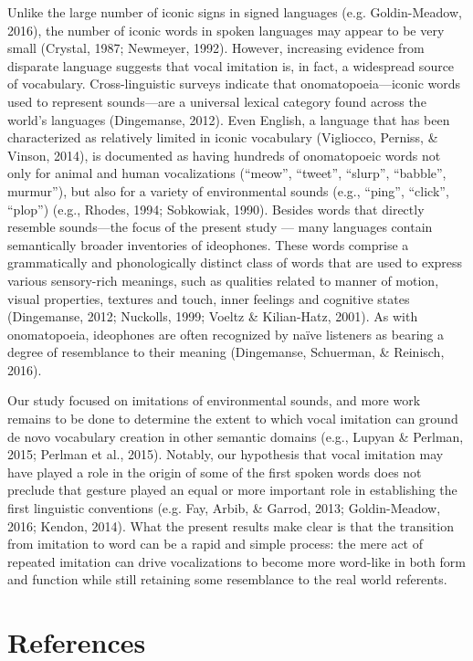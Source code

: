 \documentclass[english,floatsintext,man]{apa6}
\theoremstyle{definition}
\theoremstyle{definition}
\theoremstyle{definition}
\theoremstyle{remark}
\begin{document}
Unlike the large number of iconic signs in signed languages (e.g.
Goldin-Meadow, 2016), the number of iconic words in spoken languages may
appear to be very small (Crystal, 1987; Newmeyer, 1992). However,
increasing evidence from disparate language suggests that vocal
imitation is, in fact, a widespread source of vocabulary.
Cross-linguistic surveys indicate that onomatopoeia---iconic words used
to represent sounds---are a universal lexical category found across the
world's languages (Dingemanse, 2012). Even English, a language that has
been characterized as relatively limited in iconic vocabulary
(Vigliocco, Perniss, \& Vinson, 2014), is documented as having hundreds
of onomatopoeic words not only for animal and human vocalizations
(\enquote{meow}, \enquote{tweet}, \enquote{slurp}, \enquote{babble},
murmur''), but also for a variety of environmental sounds (e.g.,
\enquote{ping}, \enquote{click}, \enquote{plop}) (e.g., Rhodes, 1994;
Sobkowiak, 1990). Besides words that directly resemble sounds---the
focus of the present study --- many languages contain semantically
broader inventories of ideophones. These words comprise a grammatically
and phonologically distinct class of words that are used to express
various sensory-rich meanings, such as qualities related to manner of
motion, visual properties, textures and touch, inner feelings and
cognitive states (Dingemanse, 2012; Nuckolls, 1999; Voeltz \&
Kilian-Hatz, 2001). As with onomatopoeia, ideophones are often
recognized by naïve listeners as bearing a degree of resemblance to
their meaning (Dingemanse, Schuerman, \& Reinisch, 2016).

Our study focused on imitations of environmental sounds, and more work
remains to be done to determine the extent to which vocal imitation can
ground de novo vocabulary creation in other semantic domains (e.g.,
Lupyan \& Perlman, 2015; Perlman et al., 2015). Notably, our hypothesis
that vocal imitation may have played a role in the origin of some of the
first spoken words does not preclude that gesture played an equal or
more important role in establishing the first linguistic conventions
(e.g. Fay, Arbib, \& Garrod, 2013; Goldin-Meadow, 2016; Kendon, 2014).
What the present results make clear is that the transition from
imitation to word can be a rapid and simple process: the mere act of
repeated imitation can drive vocalizations to become more word-like in
both form and function while still retaining some resemblance to the
real world referents.

\hypertarget{references}{%
\section{References}\label{references}}
\end{document}

